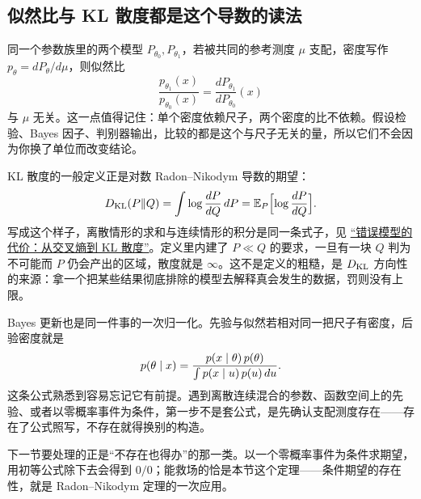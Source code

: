 \subsection{似然比与 KL 散度都是这个导数的读法}

同一个参数族里的两个模型 \(P_{\theta_0},P_{\theta_1}\)，若被共同的参考测度 \(\mu\) 支配，密度写作 \(p_\theta=dP_\theta/d\mu\)，则似然比
\[
\frac{p_{\theta_1}(x)}{p_{\theta_0}(x)}=\frac{dP_{\theta_1}}{dP_{\theta_0}}(x)
\]
与 \(\mu\) 无关。这一点值得记住：单个密度依赖尺子，两个密度的比不依赖。假设检验、Bayes 因子、判别器输出，比较的都是这个与尺子无关的量，所以它们不会因为你换了单位而改变结论。

KL 散度的一般定义正是对数 Radon--Nikodym 导数的期望：
\[
D_{\mathrm{KL}}(P\Vert Q)=\int\log\frac{dP}{dQ}\,dP=\mathbb{E}_P\Bigl[\log\frac{dP}{dQ}\Bigr].
\]
写成这个样子，离散情形的求和与连续情形的积分是同一条式子，见 \hyperref[sec:07-Information-Theory/03-Divergences/01]{``错误模型的代价：从交叉熵到 KL 散度''}。定义里内建了 \(P\ll Q\) 的要求，一旦有一块 \(Q\) 判为不可能而 \(P\) 仍会产出的区域，散度就是 \(\infty\)。这不是定义的粗糙，是 \(D_{\mathrm{KL}}\) 方向性的来源：拿一个把某些结果彻底排除的模型去解释真会发生的数据，罚则没有上限。

Bayes 更新也是同一件事的一次归一化。先验与似然若相对同一把尺子有密度，后验密度就是
\[
p(\theta\mid x)=\frac{p(x\mid\theta)\,p(\theta)}{\int p(x\mid u)\,p(u)\,du}.
\]
这条公式熟悉到容易忘记它有前提。遇到离散连续混合的参数、函数空间上的先验、或者以零概率事件为条件，第一步不是套公式，是先确认支配测度存在——存在了公式照写，不存在就得换别的构造。

下一节要处理的正是``不存在也得办''的那一类。以一个零概率事件为条件求期望，用初等公式除下去会得到 \(0/0\)；能救场的恰是本节这个定理——条件期望的存在性，就是 Radon--Nikodym 定理的一次应用。
